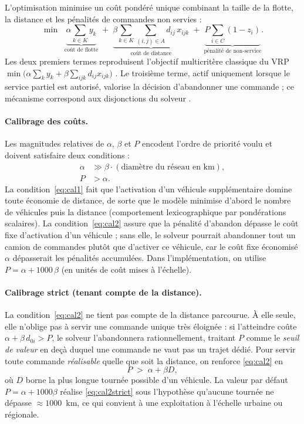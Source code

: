 \documentclass[12pt,a4paper]{report}
\begin{document}
L'optimisation minimise un coût pondéré unique combinant la taille de la
flotte, la distance et les pénalités de commandes non servies :
%
\begin{equation}
  \min \;\;
    \underbrace{\alpha \sum_{k \in K} y_k}_{\text{coût de flotte}}
    \;+\;
    \underbrace{\beta \sum_{k \in K} \sum_{(i,j) \in A} d_{ij}\, x_{ijk}}_{\text{coût de distance}}
    \;+\;
    \underbrace{P \sum_{i \in C} (1 - z_i)}_{\text{pénalité de non-service}} .
  \label{eq:objectif}
\end{equation}
%
Les deux premiers termes reproduisent l'objectif multicritère classique du
VRP $\min\bigl(\alpha \sum_k y_k + \beta \sum_{ijk} d_{ij} x_{ijk}\bigr)$
\cite{toth2014}. Le troisième terme, actif uniquement lorsque le service
partiel est autorisé, valorise la décision d'abandonner une commande ;
ce mécanisme correspond aux disjonctions du solveur \cite{ortools}.

\paragraph{Calibrage des coûts.}
Les magnitudes relatives de $\alpha$, $\beta$ et $P$ encodent l'ordre de
priorité voulu et doivent satisfaire deux conditions :
%
\begin{align}
  \alpha &\gg \beta \cdot (\text{diamètre du réseau en km}),
  \label{eq:cal1}\\
  P &> \alpha .
  \label{eq:cal2}
\end{align}
%
La condition~\eqref{eq:cal1} fait que l'activation d'un véhicule
supplémentaire domine toute économie de distance, de sorte que le modèle
minimise d'abord le nombre de véhicules puis la distance (comportement
lexicographique par pondérations scalaires). La condition~\eqref{eq:cal2}
assure que la pénalité d'abandon dépasse le coût fixe d'activation d'un
véhicule ; sans elle, le solveur pourrait abandonner tout un camion de
commandes plutôt que d'activer ce véhicule, car le coût fixe économisé
$\alpha$ dépasserait les pénalités accumulées. Dans l'implémentation, on
utilise $P = \alpha + 1000\,\beta$ (en unités de coût mises à l'échelle).

\paragraph{Calibrage strict (tenant compte de la distance).}
La condition~\eqref{eq:cal2} ne tient pas compte de la distance parcourue.
À elle seule, elle n'oblige pas à servir une commande unique très éloignée :
si l'atteindre
coûte $\alpha + \beta\,d_{0i} > P$, le solveur l'abandonnera rationnellement,
traitant $P$ comme le \emph{seuil de valeur} en deçà duquel une commande ne
vaut pas un trajet dédié. Pour servir toute commande \emph{réalisable} quelle
que soit la distance, on renforce \eqref{eq:cal2} en
%
\begin{equation}
  P \;>\; \alpha + \beta D,
  \label{eq:cal2strict}
\end{equation}
%
où $D$ borne la plus longue tournée possible d'un véhicule. La valeur par
défaut $P = \alpha + 1000\beta$ réalise \eqref{eq:cal2strict} sous
l'hypothèse qu'aucune tournée ne dépasse $\approx 1000$~km, ce qui convient à
une exploitation à l'échelle urbaine ou régionale.
\end{document}
